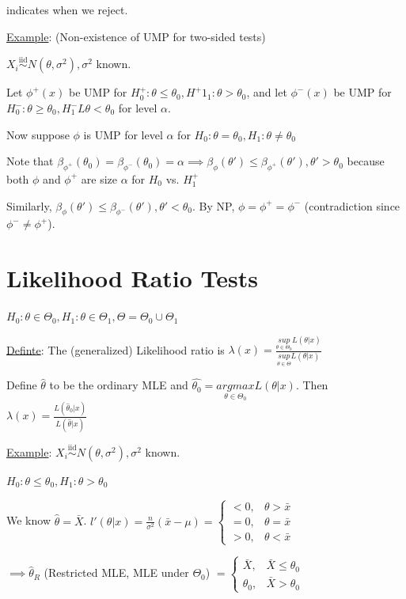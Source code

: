\documentclass{article}
\newcommand{\iiddist}{\overset{\mathrm{iid}}{\sim}}
\begin{document}
indicates when we reject. 

\underline{Example}: (Non-existence of UMP for two-sided tests)

$X_i \iiddist N(\theta, \sigma^2), \sigma^2$ known. 

Let $\phi^+(x)$ be UMP for $H^+_0: \theta \le \theta_0, H^+1_1: \theta > \theta_0$, and let $\phi^-(x)$ be UMP for $H^-_0: \theta \ge \theta_0, H^-_1L \theta < \theta_0$ for level $\alpha$. 

Now suppose $\phi$ is UMP for level $\alpha$ for $H_0: \theta = \theta_0, H_1: \theta \neq \theta_0$

Note that $\beta_{\phi^+}(\theta_0) = \beta_{\phi^-}(\theta_0) = \alpha \implies \beta_{\phi}(\theta') \le \beta_{\phi^+}(\theta'), \theta' > \theta_0$ because both $\phi$ and $\phi^+$ are size $\alpha$ for $H_0$ vs. $H^+_1$

Similarly, $\beta_{\phi}(\theta') \le \beta_{\phi^-}(\theta'), \theta' < \theta_0$. By NP, $\phi = \phi^+ = \phi^-$ (contradiction since $\phi^- \neq \phi^+$).

\section{Likelihood Ratio Tests}

$H_0: \theta \in \Theta_0, H_1: \theta \in \Theta_1, \Theta = \Theta_0 \cup \Theta_1$

\underline{Definte}: The (generalized) Likelihood ratio is $\lambda(x) = \frac{\underset{\theta \in \Theta_0}{sup} L(\theta|x)}{\underset{\theta \in \Theta}{sup} L(\theta|x)}$

Define $\hat{\theta}$ to be the ordinary MLE and $\hat{\theta_0} = \underset{\theta \in \Theta_0}{argmax}L(\theta|x)$. Then $\lambda(x) = \frac{L(\hat{\theta}_0|x)}{L(\hat{\theta}|x)}$

\underline{Example}: $X_i \iiddist N(\theta, \sigma^2), \sigma^2$ known.

$H_0: \theta \le \theta_0, H_1: \theta > \theta_0$

We know $\hat{\theta} = \bar{X}$. $l'(\theta|x) = \frac{n}{\sigma^2}(\bar{x}- \mu) = \begin{cases} <0, & \theta > \bar{x} \\ =0, & \theta = \bar{x} \\ >0, & \theta < \bar{x} \end{cases}$ 

$\implies \hat{\theta}_R$ (Restricted MLE, MLE under $\Theta_0$) $= \begin{cases} \bar{X}, & \bar{X} \le \theta_0 \\ \theta_0, & \bar{X} > \theta_0 \end{cases}$
\end{document}
